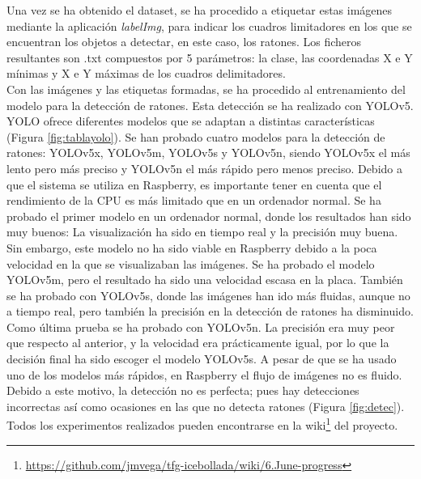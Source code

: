 Una vez se ha obtenido el dataset, se ha procedido a etiquetar estas imágenes mediante la aplicación \textit{labelImg}, para indicar los cuadros limitadores en los que se encuentran los objetos a detectar, en este caso, los ratones. Los ficheros resultantes son .txt compuestos por 5 parámetros: la clase, las coordenadas X e Y mínimas y X e Y máximas de los cuadros delimitadores.\\

Con las imágenes y las etiquetas formadas, se ha procedido al entrenamiento del modelo para la detección de ratones. Esta detección se ha realizado con YOLOv5. YOLO ofrece diferentes modelos que se adaptan a distintas características (Figura \ref{fig:tablayolo}). Se han probado cuatro modelos para la detección de ratones: YOLOv5x, YOLOv5m, YOLOv5s y YOLOv5n, siendo YOLOv5x el más lento pero más preciso y YOLOv5n el más rápido pero menos preciso. Debido a que el sistema se utiliza en Raspberry, es importante tener en cuenta que el rendimiento de la CPU es más limitado que en un ordenador normal. Se ha probado el primer modelo en un ordenador normal, donde los resultados han sido muy buenos: La visualización ha sido en tiempo real y la precisión muy buena. Sin embargo, este modelo no ha sido viable en Raspberry debido a la poca velocidad en la que se visualizaban las imágenes. Se ha probado el modelo YOLOv5m, pero el resultado ha sido una velocidad escasa en la placa. También se ha probado con YOLOv5s, donde las imágenes han ido más fluidas, aunque no a tiempo real, pero también la precisión en la detección de ratones ha disminuido. Como última prueba se ha probado con YOLOv5n. La precisión era muy peor que respecto al anterior, y la velocidad era prácticamente igual, por lo que la decisión final ha sido escoger el modelo YOLOv5s. A pesar de que se ha usado uno de los modelos más rápidos, en Raspberry el flujo de imágenes no es fluido. Debido a este motivo, la detección no es perfecta; pues hay detecciones incorrectas así como ocasiones en las que no detecta ratones (Figura \ref{fig:detec}). Todos los experimentos realizados pueden encontrarse en la wiki\footnote{\url{https://github.com/jmvega/tfg-icebollada/wiki/6.June-progress}} del proyecto.\\
